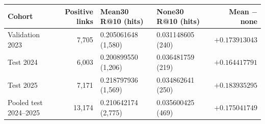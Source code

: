 \begin{tabularx}{\linewidth}{@{}XrXXr@{}}
\toprule
Cohort & Positive links & Mean30 R@10 (hits) & None30 R@10 (hits) & Mean $-$ none\\
\midrule
Validation 2023 & 7,705 & 0.205061648 (1,580) & 0.031148605 (240) & $+0.173913043$\\
Test 2024 & 6,003 & 0.200899550 (1,206) & 0.036481759 (219) & $+0.164417791$\\
Test 2025 & 7,171 & 0.218797936 (1,569) & 0.034862641 (250) & $+0.183935295$\\
Pooled test 2024--2025 & 13,174 & 0.210642174 (2,775) & 0.035600425 (469) & $+0.175041749$\\
\bottomrule
\end{tabularx}